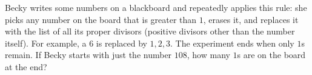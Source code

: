 Becky writes some numbers on a blackboard and repeatedly applies this rule: she picks any number on the board that is greater than $1$, erases it, and replaces it with the list of all its proper divisors (positive divisors other than the number itself). For example, a $6$ is replaced by $1,2,3$. The experiment ends when only $1$s remain. If Becky starts with just the number $108$, how many $1$s are on the board at the end?
